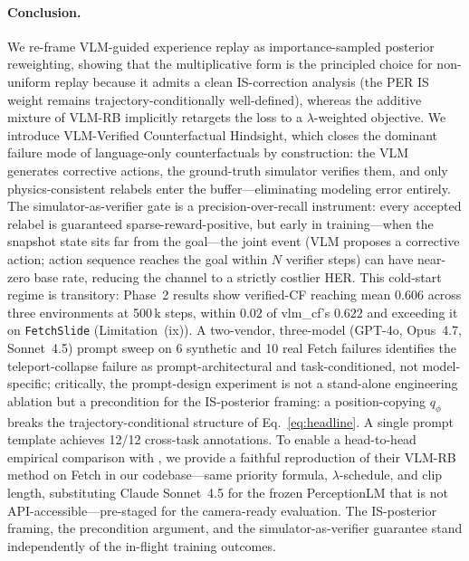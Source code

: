 \documentclass{article}
\begin{document}
\paragraph{Conclusion.}
We re-frame VLM-guided experience replay as importance-sampled posterior
reweighting, showing that the multiplicative form is the principled choice
for non-uniform replay because it admits a clean IS-correction analysis
(the PER IS weight remains trajectory-conditionally well-defined), whereas
the additive mixture of VLM-RB implicitly retargets the loss to a
$\lambda$-weighted objective.
We introduce VLM-Verified Counterfactual Hindsight, which closes the
dominant failure mode of language-only counterfactuals by construction:
the VLM generates corrective actions, the ground-truth simulator verifies
them, and only physics-consistent relabels enter the buffer---eliminating
modeling error entirely.
The simulator-as-verifier gate is a precision-over-recall instrument:
every accepted relabel is guaranteed sparse-reward-positive, but early
in training---when the snapshot state sits far from the goal---the joint
event (VLM proposes a corrective action; action sequence reaches the goal
within $N$ verifier steps) can have near-zero base rate, reducing the
channel to a strictly costlier HER.
This cold-start regime is transitory: Phase~2 results show verified-CF
reaching mean $0.606$ across three environments at 500\,k steps, within
$0.02$ of vlm\_cf's $0.622$ and exceeding it on \texttt{FetchSlide}
(Limitation~(ix)).
A two-vendor, three-model (GPT-4o, Opus~4.7, Sonnet~4.5) prompt sweep on
6 synthetic and 10 real Fetch failures identifies the teleport-collapse failure
as prompt-architectural and task-conditioned, not model-specific; critically,
the prompt-design experiment is not a stand-alone engineering ablation but a
precondition for the IS-posterior framing: a position-copying $q_\phi$ breaks
the trajectory-conditional structure of Eq.~\eqref{eq:headline}.
A single prompt template achieves 12/12 cross-task annotations.
To enable a head-to-head empirical comparison with \citet{sharony2026vlmrb},
we provide a faithful reproduction of their VLM-RB method on Fetch in our
codebase---same priority formula, $\lambda$-schedule, and clip length,
substituting Claude Sonnet~4.5 for the frozen PerceptionLM that is not
API-accessible---pre-staged for the camera-ready evaluation.
The IS-posterior framing, the precondition argument, and the simulator-as-verifier
guarantee stand independently of the in-flight training outcomes.



\end{document}

